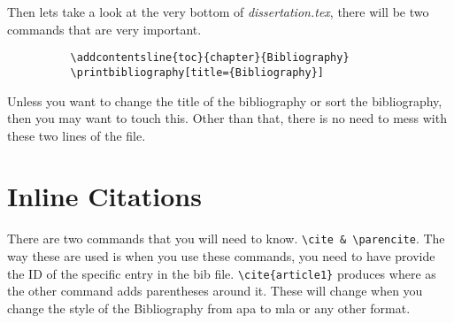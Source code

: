 \documentclass[./dissertation.tex]{subfiles}
\begin{document}
        Then lets take a look at the very bottom of \textit{dissertation.tex}, there will be two commands that are very important.
        \begin{verbatim}
          \addcontentsline{toc}{chapter}{Bibliography}
          \printbibliography[title={Bibliography}]
        \end{verbatim}
        Unless you want to change the title of the bibliography or sort the bibliography, then you may want to touch this. Other than that, there is no need to mess with these two lines of the file.

    \section{Inline Citations}
    There are two commands that you will need to know. \verb+\cite & \parencite+. The way these are used is when you use these commands, you need to have provide the ID of the specific entry in the bib file. \verb+\cite{article1}+ produces \cite{article1} where as the other command adds parentheses around it. These will change when you change the style of the Bibliography from apa to mla or any other format.
    \parencite{article1}
    \parencite{article2}
\end{document}
